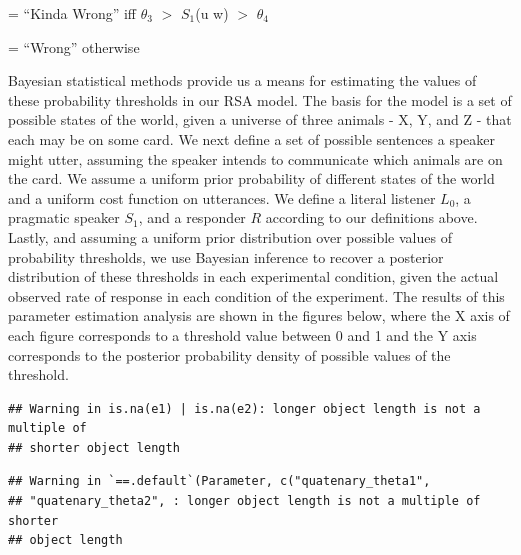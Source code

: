 \documentclass[floatsintext,man]{apa6}
\theoremstyle{definition}
\theoremstyle{definition}
\theoremstyle{definition}
\theoremstyle{remark}
\begin{document}
= \enquote{Kinda Wrong} iff \(\theta_3\) \(>\) \(S_1\)(u \textbar{} w)
\(>\) \(\theta_4\)

= \enquote{Wrong} otherwise

Bayesian statistical methods provide us a means for estimating the
values of these probability thresholds in our RSA model. The basis for
the model is a set of possible states of the world, given a universe of
three animals - X, Y, and Z - that each may be on some card. We next
define a set of possible sentences a speaker might utter, assuming the
speaker intends to communicate which animals are on the card. We assume
a uniform prior probability of different states of the world and a
uniform cost function on utterances. We define a literal listener
\(L_0\), a pragmatic speaker \(S_1\), and a responder \(R\) according to
our definitions above. Lastly, and assuming a uniform prior distribution
over possible values of probability thresholds, we use Bayesian
inference to recover a posterior distribution of these thresholds in
each experimental condition, given the actual observed rate of response
in each condition of the experiment. The results of this parameter
estimation analysis are shown in the figures below, where the X axis of
each figure corresponds to a threshold value between 0 and 1 and the Y
axis corresponds to the posterior probability density of possible values
of the threshold.

\begin{verbatim}
## Warning in is.na(e1) | is.na(e2): longer object length is not a multiple of
## shorter object length
\end{verbatim}

\begin{verbatim}
## Warning in `==.default`(Parameter, c("quatenary_theta1",
## "quatenary_theta2", : longer object length is not a multiple of shorter
## object length
\end{verbatim}
\end{document}
